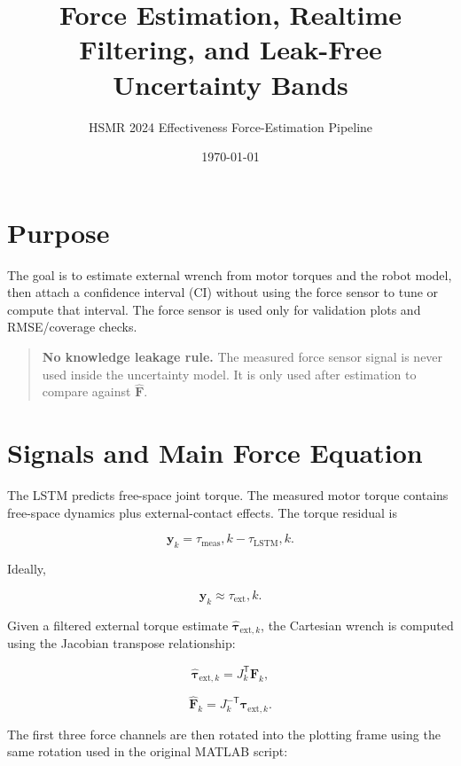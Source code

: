 \documentclass[11pt]{article}
\title{Force Estimation, Realtime Filtering, and Leak-Free Uncertainty Bands}
\author{HSMR 2024 Effectiveness Force-Estimation Pipeline}
\date{\today}
\newcommand{\tauext}{\tau_{\mathrm{ext}}}
\newcommand{\taumeas}{\tau_{\mathrm{meas}}}
\newcommand{\taulstm}{\tau_{\mathrm{LSTM}}}
\newcommand{\Fhat}{\hat{\bm F}}
\begin{document}
\maketitle

\section{Purpose}

The goal is to estimate external wrench from motor torques and the robot model,
then attach a confidence interval (CI) without using the force sensor to tune or
compute that interval. The force sensor is used only for validation plots and
RMSE/coverage checks.

\begin{quote}
\textbf{No knowledge leakage rule.} The measured force sensor signal is never
used inside the uncertainty model. It is only used after estimation to compare
against \(\Fhat\).
\end{quote}

\section{Signals and Main Force Equation}

The LSTM predicts free-space joint torque. The measured motor torque contains
free-space dynamics plus external-contact effects. The torque residual is

\begin{equation}
\bm y_k
= \taumeas,k - \taulstm,k .
\end{equation}

Ideally,

\begin{equation}
\bm y_k \approx \tauext,k .
\end{equation}

Given a filtered external torque estimate \(\hat{\bm \tau}_{\mathrm{ext},k}\), the Cartesian wrench is
computed using the Jacobian transpose relationship:

\begin{equation}
\hat{\bm \tau}_{\mathrm{ext},k} = J_k^\mathsf{T} \Fhat_k ,
\end{equation}

\begin{equation}
\Fhat_k = J_k^{-\mathsf{T}} \hat{\bm \tau}_{\mathrm{ext},k}.
\end{equation}

The first three force channels are then rotated into the plotting frame using
the same rotation used in the original MATLAB script:
\end{document}
